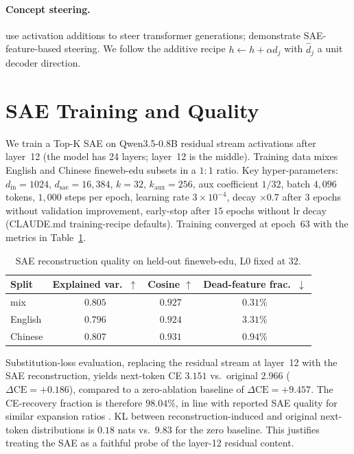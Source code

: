 \documentclass[11pt,a4paper]{article}
\begin{document}
\paragraph{Concept steering.}
\cite{turner2023activation,subramani2022extracting} use activation additions
to steer transformer generations; \cite{templeton2024scalingmonosemanticity}
demonstrate SAE-feature-based steering. We follow the additive recipe
$h \leftarrow h + \alpha \hat d_j$ with $\hat d_j$ a unit decoder direction.

\section{SAE Training and Quality}
\label{sec:sae_quality}

We train a Top-K SAE on Qwen3.5-0.8B residual stream activations after
layer~12 (the model has 24 layers; layer~12 is the middle). Training data
mixes English and Chinese fineweb-edu subsets in a $1{:}1$ ratio. Key
hyper-parameters: $d_\text{in}{=}1024$, $d_\text{sae}{=}16{,}384$, $k{=}32$,
$k_\text{aux}{=}256$, aux coefficient $1/32$, batch $4{,}096$ tokens,
$1{,}000$ steps per epoch, learning rate $3{\times}10^{-4}$, decay $\times 0.7$
after $3$ epochs without validation improvement, early-stop after $15$ epochs
without lr decay (CLAUDE.md training-recipe defaults). Training converged at
epoch~$63$ with the metrics in Table~\ref{tab:sae_quality}.

\begin{table}[h]
\centering
\small
\begin{tabular}{lccc}
\toprule
Split & Explained var.\ $\uparrow$ & Cosine $\uparrow$ & Dead-feature frac.\ $\downarrow$\\
\midrule
mix      & $0.805$ & $0.927$ & $0.31\%$\\
English  & $0.796$ & $0.924$ & $3.31\%$\\
Chinese  & $0.807$ & $0.931$ & $0.94\%$\\
\bottomrule
\end{tabular}
\caption{SAE reconstruction quality on held-out fineweb-edu, L0 fixed at $32$.}
\label{tab:sae_quality}
\end{table}

Substitution-loss evaluation, replacing the residual stream at layer~12 with
the SAE reconstruction, yields next-token CE $3.151$ vs.\ original $2.966$
($\Delta\text{CE}{=}{+}0.186$), compared to a zero-ablation baseline of $\Delta
\text{CE}{=}{+}9.457$. The CE-recovery fraction is therefore $\mathbf{98.04\%}$,
in line with reported SAE quality for similar expansion ratios
\cite{gao2024scalingsae}. KL between reconstruction-induced and original
next-token distributions is $0.18$ nats vs.\ $9.83$ for the zero baseline.
This justifies treating the SAE as a faithful probe of the layer-12 residual
content.
\end{document}
